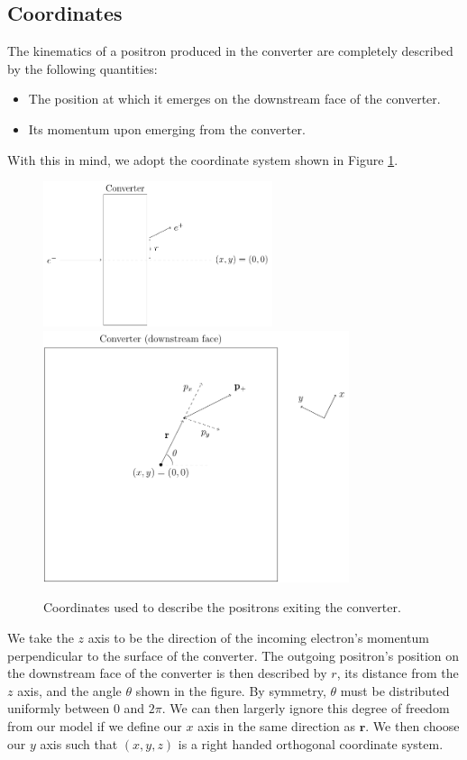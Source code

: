 \documentclass[12pt]{article}
\newcommand{\rrr}{\mathbf{r}}
\begin{document}
\subsection{Coordinates}
The kinematics of a positron produced in the converter are completely described by the following quantities:
\begin{itemize}
\item
The position at which it emerges on the downstream face of the converter.

\item
Its momentum upon emerging from the converter.

\end{itemize}

With this in mind, we adopt the coordinate system shown in Figure \ref{fig:coords}.
\begin{figure}
\centering
\includegraphics[width=0.6\textwidth]{coords1.pdf}
\includegraphics[width=0.8\textwidth]{coords2.pdf}
\caption{Coordinates used to describe the positrons exiting the converter.}
\label{fig:coords}
\end{figure}
We take the $z$ axis to be the direction of the incoming electron's momentum perpendicular to the surface of the converter.
The outgoing positron's position on the downstream face of the converter is then described by $r$, its distance from the $z$ axis, and the angle $\theta$ shown in the figure.
By symmetry, $\theta$ must be distributed uniformly between $0$ and $2\pi$.
We can then largerly ignore this degree of freedom from our model if we define our $x$ axis in the same direction as $\rrr$.
We then choose our $y$ axis such that $(x,y,z)$ is a right handed orthogonal coordinate system.
\end{document}
